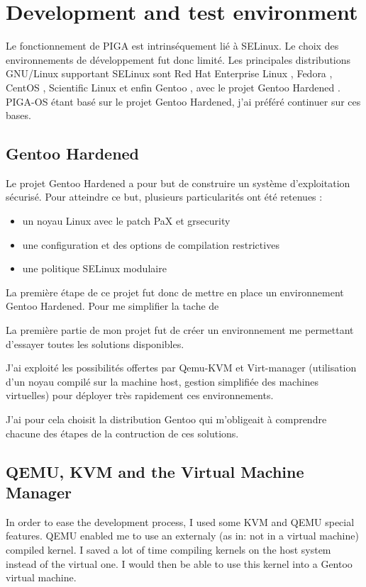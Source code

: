 \documentclass[pdftex,a4paper,titlepage,11pt]{article}
\begin{document}
\section{Development and test environment}

Le fonctionnement de PIGA est intrinséquement lié à SELinux. Le choix des environnements de développement fut donc limité. Les principales distributions GNU/Linux supportant SELinux sont Red Hat Enterprise Linux \cite{RHEL}, Fedora \cite{FEDORA}, CentOS \cite{CENTOS}, Scientific Linux \cite{SL} et enfin Gentoo \cite{GENTOO}, avec le projet Gentoo Hardened \cite{GENTOOH}. PIGA-OS étant basé sur le projet Gentoo Hardened, j'ai préféré continuer sur ces bases.

\subsection{Gentoo Hardened}

Le projet Gentoo Hardened a pour but de construire un système d'exploitation sécurisé. Pour atteindre ce but, plusieurs particularités ont été retenues :
\begin{itemize}
	\item un noyau Linux avec le patch PaX et grsecurity
	\item une configuration et des options de compilation restrictives
	\item une politique SELinux modulaire
\end{itemize}

La première étape de ce projet fut donc de mettre en place un environnement Gentoo Hardened. Pour me simplifier la tache de

La première partie de mon projet fut de créer un environnement me permettant d'essayer toutes les solutions disponibles.

J'ai exploité les possibilités offertes par Qemu-KVM et Virt-manager (utilisation d'un noyau compilé sur la machine host, gestion simplifiée des machines virtuelles) pour déployer très rapidement ces environnements.

J'ai pour cela choisit la distribution Gentoo qui m'obligeait à comprendre chacune des étapes de la contruction de ces solutions.

\subsection{QEMU, KVM and the Virtual Machine Manager}

In order to ease the development process, I used some KVM and QEMU special features. QEMU enabled me to use an externaly (as in: not in a virtual machine) compiled kernel. I saved a lot of time compiling kernels on the host system instead of the virtual one. I would then be able to use this kernel into a Gentoo virtual machine.
\end{document}
